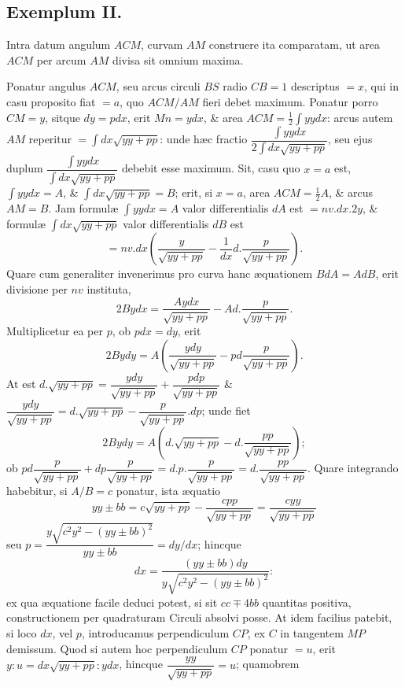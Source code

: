 \subsection*{Exemplum II.}
Intra datum angulum $ACM$, curvam $AM$ construere ita comparatam, ut area $ACM$ per arcum $AM$ divisa sit omnium maxima.

Ponatur angulus $ACM$, seu arcus circuli $BS$ radio $CB=1$ descriptus $=x$, qui in casu proposito fiat $=a$, quo $ACM/AM$ fieri debet maximum. Ponatur porro $CM=y$, sitque $dy=pdx$, erit $Mn=ydx$, \& area $ACM=\tfrac12\int yydx$: arcus autem $AM$ reperitur $=\int dx\sqrt{yy+pp}$: unde hæc fractio $\dfrac{\int yydx}{2\int dx\sqrt{yy+pp}}$, seu ejus duplum $\dfrac{\int yydx}{\int dx\sqrt{yy+pp}}$ debebit esse maximum. Sit, casu quo $x=a$ est, $\int yydx=A$, \& $\int dx\sqrt{yy+pp}=B$; erit, si $x=a$, area $ACM=\tfrac12A$, \& arcus $AM=B$. Jam formulæ $\int yydx=A$ valor differentialis $dA$ est $=nv.dx.2y$, \& formulæ $\int dx\sqrt{yy+pp}$ valor differentialis $dB$ est
\[=nv.dx\left(\frac{y}{\sqrt{yy+pp}}-\frac{1}{dx}d.\frac{p}{\sqrt{yy+pp}}\right).\]
Quare cum generaliter invenerimus pro curva hanc æquationem $BdA=AdB$, erit divisione per $nv$ instituta,
\[2Bydx=\frac{Aydx}{\sqrt{yy+pp}}-Ad.\frac{p}{\sqrt{yy+pp}}.\]
Multiplicetur ea per $p$, ob $pdx=dy$, erit
\[2Bydy=A\left(\frac{ydy}{\sqrt{yy+pp}}-pd\frac{p}{\sqrt{yy+pp}}\right).\]
At est $d.\sqrt{yy+pp}=\dfrac{ydy}{\sqrt{yy+pp}}+\dfrac{pdp}{\sqrt{yy+pp}}$ \& $\dfrac{ydy}{\sqrt{yy+pp}}=d.\sqrt{yy+pp}-\dfrac{p}{\sqrt{yy+pp}}.dp$; unde fiet
\[2Bydy=A\left(d.\sqrt{yy+pp}-d.\frac{pp}{\sqrt{yy+pp}}\right);\]
ob $pd\dfrac{p}{\sqrt{yy+pp}}+dp\dfrac{p}{\sqrt{yy+pp}}=d.p.\dfrac{p}{\sqrt{yy+pp}}=d.\dfrac{pp}{\sqrt{yy+pp}}$. Quare integrando habebitur, si $A/B=c$ ponatur, ista æquatio
\[yy\pm bb=c\sqrt{yy+pp}-\frac{cpp}{\sqrt{yy+pp}}=\frac{cyy}{\sqrt{yy+pp}}\]
seu $p=\dfrac{y\sqrt{c^2y^2-(yy\pm bb)^2}}{yy\pm bb}=dy/dx$; hincque
\[dx=\frac{(yy\pm bb)dy}{y\sqrt{c^2y^2-(yy\pm bb)^2}}:\]
ex qua æquatione facile deduci potest, si sit $cc\mp4bb$ quantitas positiva, constructionem per quadraturam Circuli absolvi posse. At idem facilius patebit, si loco $dx$, vel $p$, introducamus perpendiculum $CP$, ex $C$ in tangentem $MP$ demissum. Quod si autem hoc perpendiculum $CP$ ponatur $=u$, erit $y:u=dx\sqrt{yy+pp}:ydx$, hincque $\dfrac{yy}{\sqrt{yy+pp}}=u$; quamobrem
